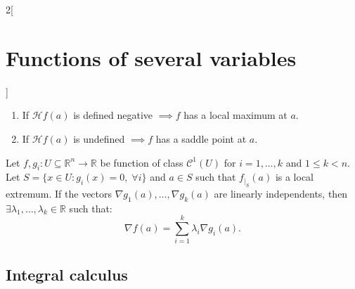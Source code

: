\documentclass[class=article,10pt,crop=false]{standalone}
\begin{document}
\begin{multicols}{2}[\section{Functions of several variables}]
\begin{theorem}
\begin{enumerate}
    \item If $\mathcal{H}f(a)$ is defined negative $\implies f$ has a local maximum at $a$.
    \item If $\mathcal{H}f(a)$ is undefined $\implies f$ has a saddle point at $a$.
\end{enumerate}
\end{theorem}
\begin{theorem}
Let $f,g_i:U\subseteq\mathbb{R}^n\rightarrow\mathbb{R}$ be function of class $\mathcal{C}^1(U)$ for $i=1,\ldots,k$ and $1\leq k<n$. Let $S=\{x\in U:g_i(x)=0,\;\forall i\}$ and $a\in S$ such that $f_{|_S}(a)$ is a local extremum. If the vectors $\nabla g_1(a),\ldots,\nabla g_k(a)$ are linearly independents, then $\exists\lambda_1,\ldots,\lambda_k\in\mathbb{R}$ such that: $$\nabla f(a)=\sum_{i=1}^k\lambda_i\nabla g_i(a).$$
\end{theorem}
\subsection{Integral calculus}

\end{multicols}
\end{document}

